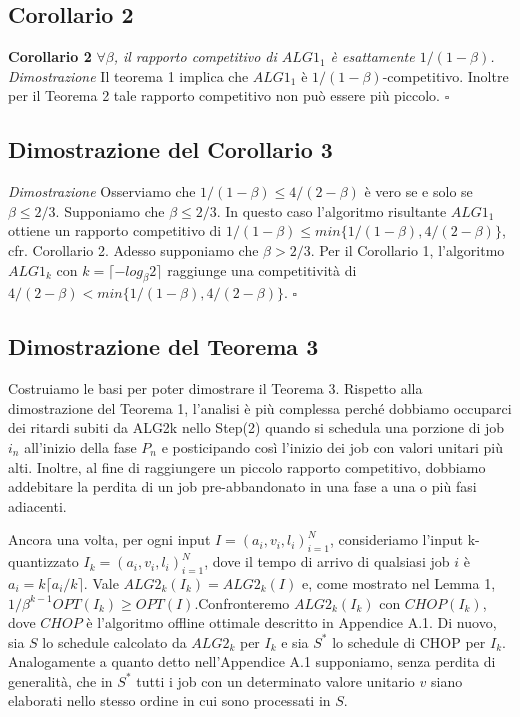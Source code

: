 \documentclass[12pt]{article}
\begin{document}
\subsection{Corollario 2}
\textbf{Corollario 2}
\textit{$\forall \beta$, il rapporto competitivo di $ALG1_{1}$ è esattamente $1 / (1 - \beta)$.}\newline\newline
\textit{Dimostrazione}
Il teorema 1 implica che $ALG1_{1}$ è $1 / (1 - \beta )$-competitivo. Inoltre per il Teorema 2 tale rapporto competitivo non può essere più piccolo. \hfill $\square$ \vspace{5mm}

\subsection{Dimostrazione del Corollario 3}
\textit{Dimostrazione}
Osserviamo che $1 / (1 - \beta ) \leq 4 / (2 - \beta )$ è vero se e solo se $\beta  \leq 2/3$. Supponiamo che $\beta  \leq 2/3$. In questo caso l'algoritmo risultante $ALG1_{1}$ ottiene un rapporto competitivo di $1 / (1 - \beta ) \leq min \{1 / (1 - \beta ), 4 / (2 - \beta )\}$, cfr. Corollario 2. Adesso supponiamo che $\beta > 2/3$. Per il Corollario 1, l'algoritmo $ALG1_{k}$ con  $k = \lceil- log_{\beta}2\rceil$ raggiunge una competitività di $4 / (2 - \beta ) <min \{1 / (1 - \beta ), 4 / (2 - \beta )\}$. \hfill $\square$ 

\subsection{Dimostrazione del Teorema 3}
Costruiamo le basi per poter dimostrare il Teorema 3. Rispetto alla dimostrazione del Teorema 1, l'analisi è più complessa perché dobbiamo occuparci dei ritardi subiti da ALG2k nello Step(2) quando si schedula una porzione di job $i_{n}$ all'inizio della fase $P_{n}$ e posticipando così l'inizio dei job con valori unitari più alti. Inoltre, al fine di raggiungere un piccolo rapporto competitivo, dobbiamo addebitare la perdita di un job pre-abbandonato in una fase a una o più fasi adiacenti.

Ancora una volta, per ogni input $I = (a_{i}, v_{i}, l_{i})^{N}_{i = 1}$, consideriamo l'input k-quantizzato $I_{k} =(a_{i}, v_{i}, l_{i})^{N}_{i = 1}$, dove il tempo di arrivo di qualsiasi job $i$ è $a_{i} = k \lceil a_{i}/k \rceil$. Vale $ALG2_{k}(I_{k}) = ALG2_{k}(I)$ e, come mostrato nel Lemma 1, $1 / \beta^{k-1} OPT (I_{k}) \geq OPT(I)$.Confronteremo $ALG2_{k}(I_{k})$ con $CHOP(I_{k})$, dove $CHOP$ è l'algoritmo offline ottimale descritto in Appendice A.1. Di nuovo, sia $S$ lo schedule calcolato da $ALG2_{k}$ per $I_{k}$ e sia $S^{*}$ lo schedule di CHOP per $I_{k}$. Analogamente a quanto detto nell'Appendice A.1 supponiamo, senza perdita di generalità, che in $S^{*}$ tutti i job con un determinato valore unitario $v$ siano elaborati nello stesso ordine in cui sono processati in $S$.
\end{document}
